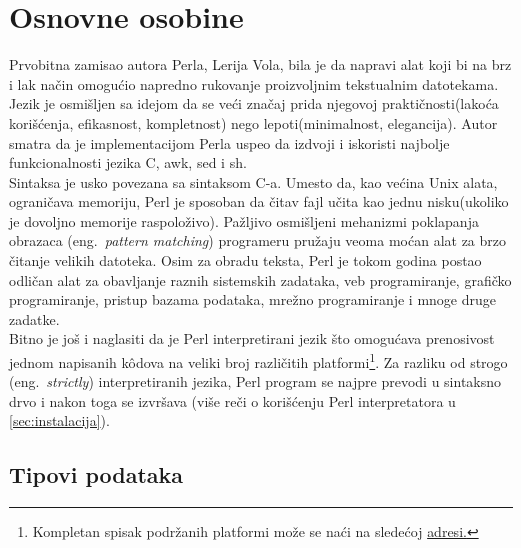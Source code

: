 \documentclass[a4paper]{article}
\begin{document}
\section{Osnovne osobine}
\label{sec:osobine}

Prvobitna zamisao autora Perla, Lerija Vola, bila je da napravi alat koji bi na brz i lak način omogućio napredno rukovanje proizvoljnim tekstualnim datotekama. Jezik je osmišljen sa idejom da se veći značaj prida njegovoj praktičnosti(lakoća korišćenja, efikasnost, kompletnost) nego lepoti(minimalnost, elegancija). Autor smatra da je implementacijom Perla uspeo da izdvoji i iskoristi najbolje funkcionalnosti jezika C, awk, sed i sh\cite{wallperl}.\\
Sintaksa je usko povezana sa sintaksom C-a. Umesto da, kao većina Unix alata, ograničava memoriju, Perl je sposoban da čitav fajl učita kao jednu nisku(ukoliko je dovoljno memorije raspoloživo). Pažljivo osmišljeni mehanizmi poklapanja obrazaca (eng.~{\em pattern matching}) programeru pružaju veoma moćan alat za brzo čitanje velikih datoteka.
Osim za obradu teksta, Perl je tokom godina postao odličan alat za obavljanje raznih sistemskih zadataka, veb programiranje, grafičko programiranje, pristup bazama podataka, mrežno programiranje i mnoge druge zadatke. \\ 

Bitno je još i naglasiti da je Perl interpretirani jezik što omogućava prenosivost jednom napisanih k\^{o}dova na veliki broj različitih platformi\footnote{Kompletan spisak podržanih platformi može se naći na sledećoj \href{https://perldoc.perl.org/perlport.html#Supported-Platforms}{adresi.}}. Za razliku od strogo (eng.~{\em strictly}) interpretiranih jezika, Perl program se najpre prevodi u sintaksno drvo i nakon toga se izvršava (više reči o korišćenju Perl interpretatora u 
\ref{sec:instalacija}).

\subsection{Tipovi podataka}
\end{document}
